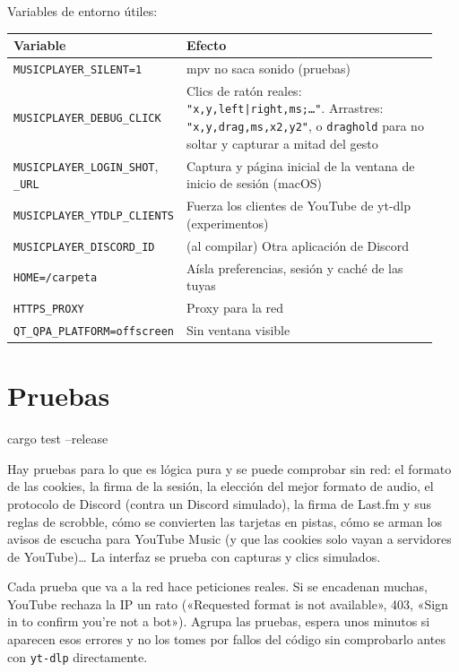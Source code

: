 Variables de entorno útiles:

\begin{center}
\small
\begin{longtable}{@{}p{0.34\linewidth}p{0.6\linewidth}@{}}
\toprule
Variable & Efecto \\
\midrule
\endhead
\texttt{MUSICPLAYER\_SILENT=1} & mpv no saca sonido (pruebas) \\
\texttt{MUSICPLAYER\_DEBUG\_CLICK} & Clics de ratón reales: \texttt{"x,y,left|right,ms;…"}. Arrastres: \texttt{"x,y,drag,ms,x2,y2"}, o \texttt{draghold} para no soltar y capturar a mitad del gesto \\
\texttt{MUSICPLAYER\_LOGIN\_SHOT}, \texttt{\_URL} & Captura y página inicial de la ventana de inicio de sesión (macOS) \\
\texttt{MUSICPLAYER\_YTDLP\_CLIENTS} & Fuerza los clientes de YouTube de yt-dlp (experimentos) \\
\texttt{MUSICPLAYER\_DISCORD\_ID} & (al compilar) Otra aplicación de Discord \\
\texttt{HOME=/carpeta} & Aísla preferencias, sesión y caché de las tuyas \\
\texttt{HTTPS\_PROXY} & Proxy para la red \\
\texttt{QT\_QPA\_PLATFORM=offscreen} & Sin ventana visible \\
\bottomrule
\end{longtable}
\end{center}

\section{Pruebas}

\begin{terminal}
cargo test --release
\end{terminal}

Hay pruebas para lo que es lógica pura y se puede comprobar sin red: el formato de las
cookies, la firma de la sesión, la elección del mejor formato de audio, el protocolo de
Discord (contra un Discord simulado), la firma de Last.fm y sus reglas de scrobble, cómo se
convierten las tarjetas en pistas, cómo se arman los avisos de escucha para YouTube Music (y
que las cookies solo vayan a servidores de YouTube)\dots{} La interfaz se prueba con capturas y clics simulados.

\begin{trampa}
Cada prueba que va a la red hace peticiones reales. Si se encadenan muchas, YouTube rechaza
la IP un rato («Requested format is not available», 403, «Sign in to confirm you're not a
bot»). Agrupa las pruebas, espera unos minutos si aparecen esos errores y no los tomes por
fallos del código sin comprobarlo antes con \texttt{yt-dlp} directamente.
\end{trampa}
